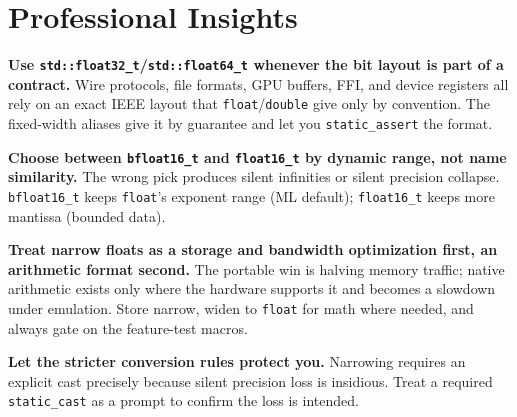 \section{Professional Insights}

\textbf{Use \lstinline|std::float32_t|/\lstinline|std::float64_t| whenever the bit layout is part of a contract.} Wire protocols, file formats, GPU buffers, FFI, and device registers all rely on an exact IEEE layout that \lstinline|float|/\lstinline|double| give only by convention. The fixed-width aliases give it by guarantee and let you \lstinline|static_assert| the format.

\textbf{Choose between \lstinline|bfloat16_t| and \lstinline|float16_t| by dynamic range, not name similarity.} The wrong pick produces silent infinities or silent precision collapse. \lstinline|bfloat16_t| keeps \lstinline|float|'s exponent range (ML default); \lstinline|float16_t| keeps more mantissa (bounded data).

\textbf{Treat narrow floats as a storage and bandwidth optimization first, an arithmetic format second.} The portable win is halving memory traffic; native arithmetic exists only where the hardware supports it and becomes a slowdown under emulation. Store narrow, widen to \lstinline|float| for math where needed, and always gate on the feature-test macros.

\textbf{Let the stricter conversion rules protect you.} Narrowing requires an explicit cast precisely because silent precision loss is insidious. Treat a required \lstinline|static_cast| as a prompt to confirm the loss is intended.
